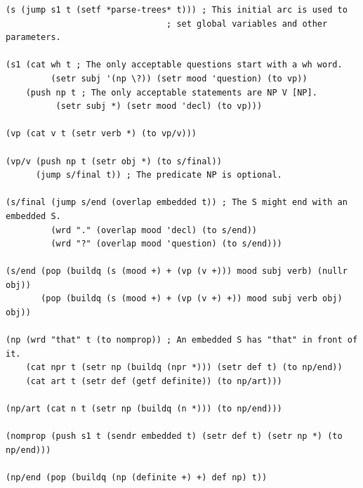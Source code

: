 \documentclass{book}
\begin{document}
\begin{verbatim}
(s (jump s1 t (setf *parse-trees* t))) ; This initial arc is used to
                                ; set global variables and other parameters.

(s1 (cat wh t ; The only acceptable questions start with a wh word.
         (setr subj '(np \?)) (setr mood 'question) (to vp))
    (push np t ; The only acceptable statements are NP V [NP].
          (setr subj *) (setr mood 'decl) (to vp)))

(vp (cat v t (setr verb *) (to vp/v)))

(vp/v (push np t (setr obj *) (to s/final))
      (jump s/final t)) ; The predicate NP is optional.

(s/final (jump s/end (overlap embedded t)) ; The S might end with an embedded S.
         (wrd "." (overlap mood 'decl) (to s/end))
         (wrd "?" (overlap mood 'question) (to s/end)))

(s/end (pop (buildq (s (mood +) + (vp (v +))) mood subj verb) (nullr obj))
       (pop (buildq (s (mood +) + (vp (v +) +)) mood subj verb obj) obj))

(np (wrd "that" t (to nomprop)) ; An embedded S has "that" in front of it.
    (cat npr t (setr np (buildq (npr *))) (setr def t) (to np/end))
    (cat art t (setr def (getf definite)) (to np/art)))

(np/art (cat n t (setr np (buildq (n *))) (to np/end)))

(nomprop (push s1 t (sendr embedded t) (setr def t) (setr np *) (to np/end)))

(np/end (pop (buildq (np (definite +) +) def np) t))
\end{verbatim}
\end{document}
